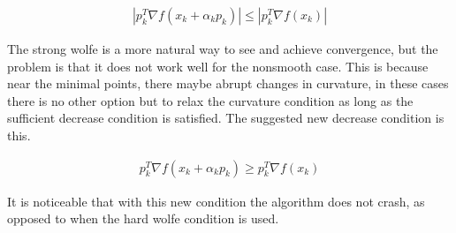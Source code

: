 \begin{equation}
  \begin{aligned}
    |p_k^T \nabla f(x_k + \alpha _k p_k)| \leq |p_k^T \nabla f(x_k)|
  \end{aligned}
\end{equation}

The strong wolfe is a more natural way to see and achieve convergence, but the problem is that it does not work well for the nonsmooth case. This is because near the minimal points, there maybe abrupt changes in curvature, in these cases there is no other option but to relax the curvature condition as long as the sufficient decrease condition is satisfied. The suggested new decrease condition is this.

\begin{equation}
  \begin{aligned}
    p_k^T \nabla f(x_k + \alpha _k p_k) \geq p_k^T \nabla f(x_k)
  \end{aligned}
\end{equation}

It is noticeable that with this new condition the algorithm does not crash, as opposed to when the hard wolfe condition is used.
